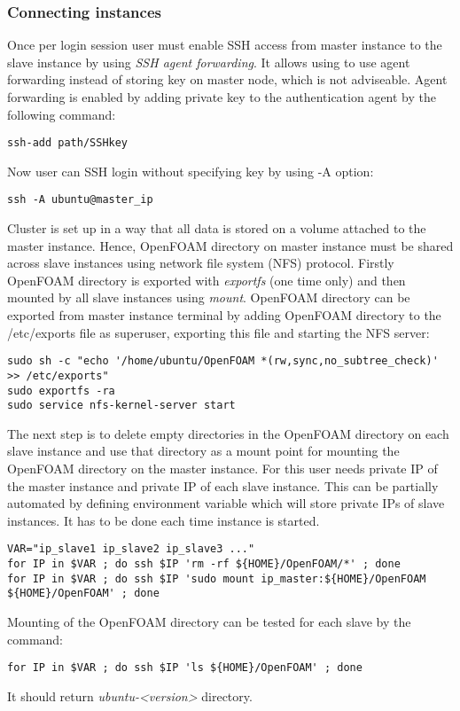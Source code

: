 \documentclass[12pt,english]{article}
\begin{document}
\subsubsection{Connecting instances}
Once per login session user must enable SSH access from master instance to the slave instance by using \textit{SSH agent forwarding}. It allows using to use agent forwarding instead of storing key on master node, which is not adviseable. Agent forwarding is enabled by adding private key to the authentication agent by the following command:
\begin{lstlisting}
ssh-add path/SSHkey
\end{lstlisting}
Now user can SSH login without specifying key by using -A option:
\begin{lstlisting}
ssh -A ubuntu@master_ip
\end{lstlisting}
Cluster is set up in a way that all data is stored on a volume attached to the master instance. Hence, OpenFOAM directory on master instance must be shared across slave instances using network file system (NFS) protocol. Firstly OpenFOAM directory is exported with \textit{exportfs} (one time only) and then mounted by all slave instances using \textit{mount}.
OpenFOAM directory can be exported from master instance terminal by adding OpenFOAM directory to the /etc/exports file as superuser, exporting this file and starting the NFS server:
\begin{lstlisting}
sudo sh -c "echo '/home/ubuntu/OpenFOAM *(rw,sync,no_subtree_check)' >> /etc/exports"
sudo exportfs -ra
sudo service nfs-kernel-server start
\end{lstlisting}
The next step is to delete empty directories in the OpenFOAM directory on each slave instance and use that directory as a mount point for mounting the OpenFOAM directory on the master instance. For this user needs private IP of the master instance and private IP of each slave instance. This can be partially automated by defining environment variable which will store private IPs of slave instances. It has to be done each time instance is started.
\begin{lstlisting}
VAR="ip_slave1 ip_slave2 ip_slave3 ..."
for IP in $VAR ; do ssh $IP 'rm -rf ${HOME}/OpenFOAM/*' ; done
for IP in $VAR ; do ssh $IP 'sudo mount ip_master:${HOME}/OpenFOAM ${HOME}/OpenFOAM' ; done
\end{lstlisting}
Mounting of the OpenFOAM directory can be tested for each slave by the command:
\begin{lstlisting}
for IP in $VAR ; do ssh $IP 'ls ${HOME}/OpenFOAM' ; done
\end{lstlisting}
It should return \textit{ubuntu-<version>} directory.
\end{document}
